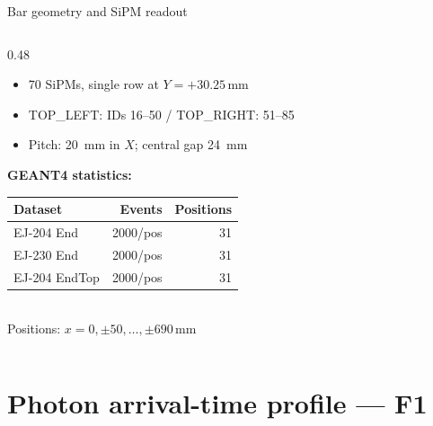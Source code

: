 \documentclass[aspectratio=169,9pt]{beamer}
\begin{document}
\begin{frame}{Bar geometry and SiPM readout}
\begin{columns}[T]
\begin{column}{0.48\textwidth}
\begin{itemize}
        \item 70 SiPMs, single row at $Y=+30.25$\,mm
        \item TOP\_LEFT: IDs 16–50 / TOP\_RIGHT: 51–85
        \item Pitch: \SI{20}{\mm} in $X$; central gap \SI{24}{\mm}
      \end{itemize}
      \vspace{0.3em}
      \textbf{GEANT4 statistics:}
      \begin{center}
        \small
        \begin{tabular}{lrr}
          \toprule
          Dataset & Events & Positions \\
          \midrule
          EJ-204 End & 2000/pos & 31 \\
          EJ-230 End & 2000/pos & 31 \\
          EJ-204 EndTop & 2000/pos & 31 \\
          \bottomrule
        \end{tabular}\\[0.2em]
        {\footnotesize Positions: $x = 0, \pm50, \ldots, \pm690$\,mm}
      \end{center}
    \end{column}
  \end{columns}
\end{frame}

\section{Photon arrival-time profile — F1}
\end{document}
